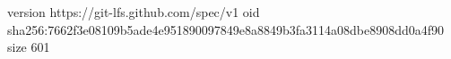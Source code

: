version https://git-lfs.github.com/spec/v1
oid sha256:7662f3e08109b5ade4e951890097849e8a8849b3fa3114a08dbe8908dd0a4f90
size 601
